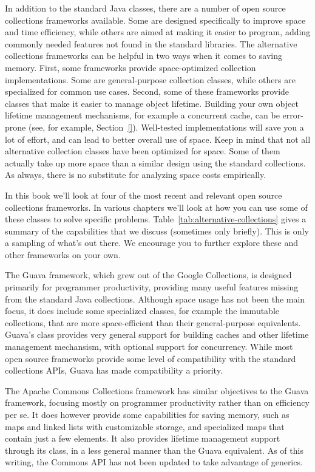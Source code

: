 In addition to the standard Java classes, there are a number of
open source collections frameworks available. Some are designed
specifically to improve space and time efficiency, while others are aimed at
making it easier to program, adding commonly needed features not
found in the standard libraries. 
The alternative collections frameworks can be helpful in two ways when it comes to saving memory. First,
some frameworks provide space-optimized collection implementations. Some are
general-purpose collection classes, while  
others are specialized for common use cases. Second, some of these frameworks
provide classes that make it easier to manage object lifetime. Building your
own object lifetime management mechanisms, for example a concurrent cache, can
be error-prone (see, for example, Section~\ref{}). Well-tested implementations
will save you a lot of effort, and can lead to better overall use of space.
Keep in mind that not all alternative collection classes have
been optimized for space.
Some of them actually take up more space than a similar design using the
standard collections. As always, there is no substitute for analyzing space costs empirically.


In this book we'll look at four of the most recent and relevant
open source collections frameworks. In various chapters we'll look at how you
can use some of these classes to solve specific problems.
Table~\ref{tab:alternative-collections} gives a summary of the capabilities that
we discuss (sometimes only briefly). This is only a sampling of what's out
there. We encourage you to further explore these and other frameworks on your own.

The Guava framework, which grew out of the Google Collections, is
designed primarily for programmer productivity, providing many useful
features missing from the standard Java collections. 
Although space usage has not been the main focus, it does include some
specialized classes, for example the immutable collections, that are more
space-efficient than their general-purpose equivalents. Guava's 
class provides very general support for 
building caches and other lifetime management mechansism, with optional support for concurrency. 
While most open source frameworks provide some level of compatibility with the
standard collections APIs, Guava has made compatibility a priority.

The Apache Commons Collections framework has similar objectives to the Guava
framework, focusing mostly on programmer productivity rather than on
efficiency per se. 
It does however provide some capabilities for saving memory, such as
maps and linked lists with customizable storage, and specialized 
maps that contain just a few elements. It also provides lifetime management
support through its  class, in a less general
manner than the Guava equivalent. As of this writing,
the Commons API has not been updated to take advantage of generics.

